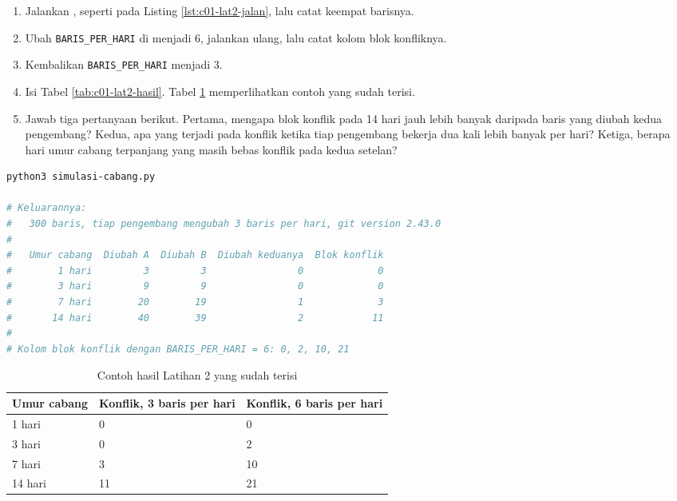 \begin{enumerate}
  \item Jalankan , seperti pada Listing
        \ref{lst:c01-lat2-jalan}, lalu catat keempat barisnya.
  \item Ubah \texttt{BARIS\_PER\_HARI} di  menjadi
        6, jalankan ulang, lalu catat kolom blok konfliknya.
  \item Kembalikan \texttt{BARIS\_PER\_HARI} menjadi 3.
  \item Isi Tabel \ref{tab:c01-lat2-hasil}. Tabel \ref{tab:c01-lat2-contoh}
        memperlihatkan contoh yang sudah terisi.
  \item Jawab tiga pertanyaan berikut. Pertama, mengapa blok konflik pada 14
        hari jauh lebih banyak daripada baris yang diubah kedua pengembang?
        Kedua, apa yang terjadi pada konflik ketika tiap pengembang bekerja
        dua kali lebih banyak per hari? Ketiga, berapa hari umur cabang
        terpanjang yang masih bebas konflik pada kedua setelan?
\end{enumerate}

\begin{lstlisting}[language=bash, caption={Mengukur konflik menurut umur cabang, tersedia di \berkas{sources/chapter01/simulasi-cabang.py}}, label={lst:c01-lat2-jalan}]
python3 simulasi-cabang.py

# Keluarannya:
#   300 baris, tiap pengembang mengubah 3 baris per hari, git version 2.43.0
#
#   Umur cabang  Diubah A  Diubah B  Diubah keduanya  Blok konflik
#        1 hari         3         3                0             0
#        3 hari         9         9                0             0
#        7 hari        20        19                1             3
#       14 hari        40        39                2            11
#
# Kolom blok konflik dengan BARIS_PER_HARI = 6: 0, 2, 10, 21
\end{lstlisting}

\begin{table}[!htb]
  \centering
  \caption{Contoh hasil Latihan 2 yang sudah terisi}
  \label{tab:c01-lat2-contoh}
  \begin{tabularx}{\textwidth}{Xll}
    \hline
    \textbf{Umur cabang} & \textbf{Konflik, 3 baris per hari} & \textbf{Konflik, 6 baris per hari} \\
    \hline
    1 hari & 0 & 0 \\
    \hline
    3 hari & 0 & 2 \\
    \hline
    7 hari & 3 & 10 \\
    \hline
    14 hari & 11 & 21 \\
    \hline
  \end{tabularx}
\end{table}

